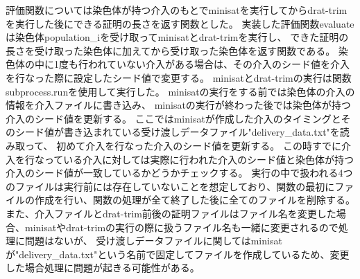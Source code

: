 評価関数については染色体が持つ介入のもとでminisatを実行してからdrat-trimを実行した後にできる証明の長さを返す関数とした。
実装した評価関数evaluateは染色体population\_iを受け取ってminisatとdrat-trimを実行し、
できた証明の長さを受け取った染色体に加えてから受け取った染色体を返す関数である。
染色体の中に1度も行われていない介入がある場合は、その介入のシード値を介入を行なった際に設定したシード値で変更する。
minisatとdrat-trimの実行は関数subprocess.runを使用して実行した。
minisatの実行をする前では染色体の介入の情報を介入ファイルに書き込み、
minisatの実行が終わった後では染色体が持つ介入のシード値を更新する。
ここではminisatが作成した介入のタイミングとそのシード値が書き込まれている受け渡しデータファイル"delivery\_data.txt"を読み取って、
初めて介入を行なった介入のシード値を更新する。
この時すでに介入を行なっている介入に対しては実際に行われた介入のシード値と染色体が持つ介入のシード値が一致しているかどうかチェックする。
実行の中で扱われる4つのファイルは実行前には存在していないことを想定しており、関数の最初にファイルの作成を行い、関数の処理が全て終了した後に全てのファイルを削除する。
また、介入ファイルとdrat-trim前後の証明ファイルはファイル名を変更した場合、minisatやdrat-trimの実行の際に扱うファイル名も一緒に変更されるので処理に問題はないが、
受け渡しデータファイルに関してはminisatが"delivery\_data.txt"という名前で固定してファイルを作成しているため、変更した場合処理に問題が起きる可能性がある。
